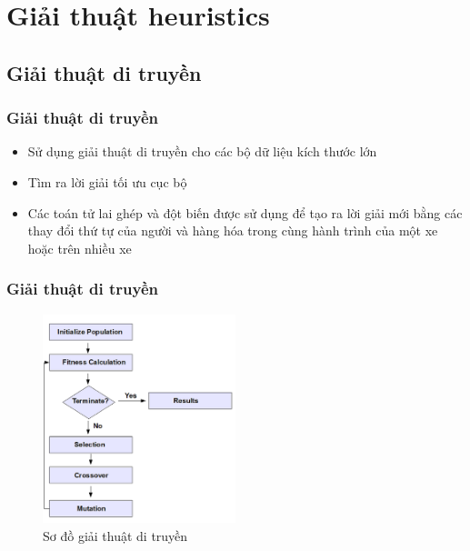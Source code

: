 \documentclass{beamer}
\begin{document}
	
	\section{Giải thuật heuristics}
	
	
	\subsection{Giải thuật di truyền}
	
	\begin{frame}
		\frametitle{Giải thuật di truyền}
		\begin{itemize}
			\item Sử dụng giải thuật di truyền cho các bộ dữ liệu kích thước lớn
			\item Tìm ra lời giải tối ưu cục bộ
			\item Các toán tử lai ghép và đột biến được sử dụng để tạo ra lời giải mới bằng các thay đổi thứ tự của người và hàng hóa trong cùng hành trình của một xe hoặc trên nhiều xe
		\end{itemize}
	\end{frame}
	
	\begin{frame}
		\frametitle{Giải thuật di truyền}
		\begin{figure}
			\centering
			\caption{Sơ đồ giải thuật di truyền}
			\includegraphics[width=0.5\textwidth]{images/ga-flow.png}
		\end{figure}
	\end{frame}
	
\end{document}
